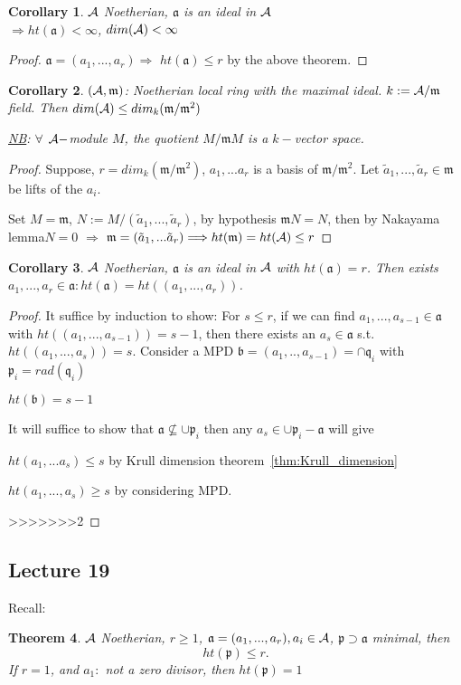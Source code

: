 \documentclass[11pt]{article}
\newtheorem{thm}{Theorem}[section]
\newtheorem{cor}[thm]{Corollary}
\newcommand{\sca}{{\mathfrak a}}
\newcommand{\scb}{{\mathfrak b}}
\newcommand{\scm}{{\mathfrak m}}
\newcommand{\scp}{{\mathfrak p}}
\newcommand{\scq}{\mathfrak q}
\newcommand{\cala}{{\cal A}}
\newcommand{\Lrta}{\Longrightarrow}
\begin{document}
\begin{cor}
$\cala$ Noetherian, $\sca$ is an ideal in $\cala$\\
$\Lrta ht(\sca)<\infty$, $dim(\cala)<\infty$
\end{cor}
\begin{proof}
$\sca=(a_1,...,a_r)\Lrta$ $ht(\sca)\leq r$ by the above theorem.
\end{proof}
\begin{cor}
$(\cala,\scm)$: Noetherian local ring with the maximal ideal. $k:=\cala/\scm$ field. Then $dim(\cala)\leq dim_k(\scm/\scm^2)$

\underline{NB}: $\forall$ $\cala-$module $M$, the quotient $M/\scm M$ is a $k-$vector space.
\end{cor}
\begin{proof}
Suppose, $r=dim_k(\scm/\scm^2)$, $a_1,...a_r$ is a basis of $\scm/\scm^2$. Let $\tilde{a}_1,...,\tilde{a}_r\in\scm$ be lifts of the $a_i$. 

Set $M=\scm$, $N:=M/(\tilde{a}_1,...,\tilde{a}_r)$, by hypothesis $\scm N=N$, then by Nakayama lemma$N=0$ $\Lrta$ $\scm=(\tilde{a}_1,...\tilde{a}_r)\Lrta ht(\scm)=ht(\cala)\leq r$
\end{proof}

\begin{cor}
$\cala$ Noetherian, $\sca$ is an ideal in $\cala$ with $ht(\sca)=r$. Then exists $a_1,...,a_r\in\sca:ht(\sca)=ht((a_1,...,a_r))$.
\end{cor}
\begin{proof}
It suffice by induction to show: For $s\leq r$, if we can find $a_1,...,a_{s-1}\in\sca$ with $ht((a_1,...,a_{s-1}))=s-1$, then there exists an $a_s\in\sca$ s.t. $ht((a_1,...,a_s))=s$.
Consider a MPD $\scb=(a_1,..,a_{s-1})=\cap\scq_i$ with $\scp_i=rad(\scq_i)$

$ht(\scb)=s-1$

It will suffice to show that $\sca\not\subseteq \cup\scp_i $
then any $a_s\in\cup \scp_i-\sca$ will give 

$ht(a_1,...a_s)\leq s$ by Krull dimension theorem~\ref{thm:Krull_dimension}

$ht(a_1,...,a_s)\geq s$ by considering MPD.

>>>>>>>2
\end{proof}



\subsection{Lecture 19}
Recall: 
\begin{thm}\label{thm:thm0}
$\cala$ Noetherian, $r\geq 1$, $\sca=(a_1,...,a_r), a_i\in\cala$, $\scp\supset \sca$ minimal, then 
$$
ht(\scp)\leq r.
$$
If $r=1$, and $a_1:$ not a zero divisor, then $ht(\scp)=1$
\end{thm}
\end{document}
